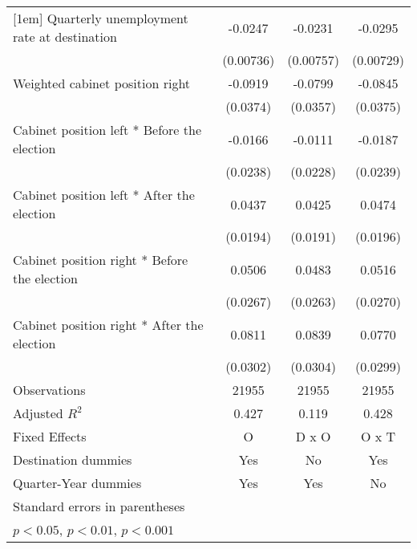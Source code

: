 \begin{table}[htbp]
\begin{tabular}{l*{3}{c}}
[1em]
Quarterly unemployment rate at destination&     -0.0247\sym{**} &     -0.0231\sym{**} &     -0.0295\sym{***}\\
                    &   (0.00736)         &   (0.00757)         &   (0.00729)         \\
[1em]
Weighted cabinet position right&     -0.0919\sym{*}  &     -0.0799\sym{*}  &     -0.0845\sym{*}  \\
                    &    (0.0374)         &    (0.0357)         &    (0.0375)         \\
[1em]
Cabinet position left * Before the election&     -0.0166         &     -0.0111         &     -0.0187         \\
                    &    (0.0238)         &    (0.0228)         &    (0.0239)         \\
[1em]
Cabinet position left * After the election&      0.0437\sym{*}  &      0.0425\sym{*}  &      0.0474\sym{*}  \\
                    &    (0.0194)         &    (0.0191)         &    (0.0196)         \\
[1em]
Cabinet position right * Before the election&      0.0506         &      0.0483         &      0.0516         \\
                    &    (0.0267)         &    (0.0263)         &    (0.0270)         \\
[1em]
Cabinet position right * After the election&      0.0811\sym{*}  &      0.0839\sym{**} &      0.0770\sym{*}  \\
                    &    (0.0302)         &    (0.0304)         &    (0.0299)         \\
\hline
Observations        &       21955         &       21955         &       21955         \\
Adjusted \(R^{2}\)  &       0.427         &       0.119         &       0.428         \\
Fixed Effects       &           O         &       D x O         &       O x T         \\
Destination dummies &         Yes         &          No         &         Yes         \\
Quarter-Year dummies&         Yes         &         Yes         &          No         \\
\hline\hline
\multicolumn{4}{l}{\footnotesize Standard errors in parentheses}\\
\multicolumn{4}{l}{\footnotesize \sym{*} \(p<0.05\), \sym{**} \(p<0.01\), \sym{***} \(p<0.001\)}\\
\end{tabular}
\end{table}
